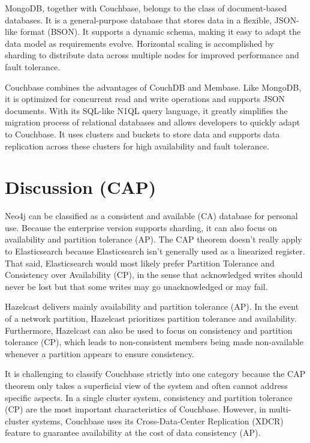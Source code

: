 MongoDB, together with Couchbase, belongs to the class of document-based databases. It is a general-purpose database that stores data in a flexible, JSON-like format (BSON). It supports a dynamic schema, making it easy to adapt the data model as requirements evolve. Horizontal scaling is accomplished by sharding to distribute data across multiple nodes for improved performance and fault tolerance. 

Couchbase combines the advantages of CouchDB and Membase. Like MongoDB, it is optimized for concurrent read and write operations and supports JSON documents. With its SQL-like N1QL query language, it greatly simplifies the migration process of relational databases and allows developers to quickly adapt to Couchbase. It uses clusters and buckets to store data and supports data replication across these clusters for high availability and fault tolerance. 
\section*{Discussion (CAP)}
Neo4j can be classified as a consistent and available (CA) database for personal use. Because the enterprise version supports sharding, it can also focus on availability and partition tolerance (AP). 
The CAP theorem doesn’t really apply to Elasticsearch because Elasticsearch isn't generally used as a linearized register. That said, Elasticsearch would most likely prefer Partition Tolerance and Consistency over Availability (CP), in the sense that acknowledged writes should never be lost but that some writes may go unacknowledged or may fail. 

Hazelcast delivers mainly availability and partition tolerance (AP). In the event of a network partition, Hazelcast prioritizes partition tolerance and availability. Furthermore, Hazelcast can also be used to focus on consistency and partition tolerance (CP), which leads to non-consistent members being made non-available whenever a partition appears to ensure consistency. 

It is challenging to classify Couchbase strictly into one category because the CAP theorem only takes a superficial view of the system and often cannot address specific aspects. In a single cluster system, consistency and partition tolerance (CP) are the most important characteristics of Couchbase. However, in multi-cluster systems, Couchbase uses its Cross-Data-Center Replication (XDCR) feature to guarantee availability at the cost of data consistency (AP).

